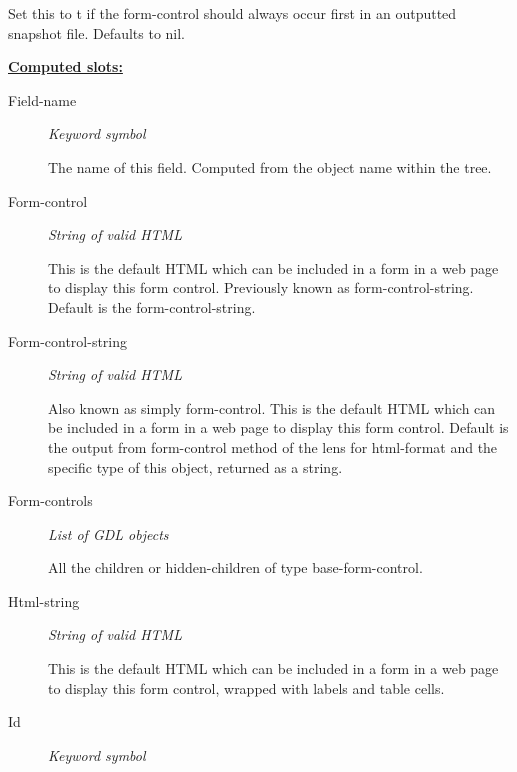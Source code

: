 \documentclass [11pt]{book}
\begin{document}
\begin{itemize}
\begin{description}
 Set this to t if the form-control should always occur first in an outputted snapshot file.
Defaults to nil.




\end{description}






\textbf{
\underline{Computed slots:}}

\begin{description}

\item [Field-name]
\emph{Keyword symbol}

 The name of this field. Computed from the object name within the tree.




\item [Form-control]
\emph{String of valid HTML}

 This is the default HTML which can be included in a form in a web page to display this form control.
Previously known as form-control-string. Default is the form-control-string.




\item [Form-control-string]
\emph{String of valid HTML}

 Also known as simply form-control.
This is the default HTML which can be included in a form in a web page to display this form control.
Default is the output from form-control method of the lens for html-format and the
specific type of this object, returned as a string.




\item [Form-controls]
\emph{List of GDL objects}

 All the children or hidden-children
of type base-form-control.




\item [Html-string]
\emph{String of valid HTML}

 This is the default HTML which can be included in a form in a web page to display this form control, wrapped with labels and table cells.




\item [Id]
\emph{Keyword symbol}


\end{description}
\end{itemize}
\end{document}
